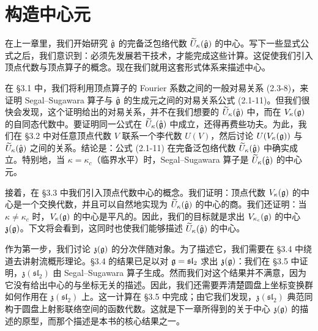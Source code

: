 
\chapter{构造中心元}

在上一章里，我们开始研究 $\hat{\mathfrak{g}}$ 的完备泛包络代数 $\widetilde U_\kappa(\hat{\mathfrak{g}})$ 的中心。写下一些显式公式之后，我们意识到：必须先发展若干技术，才能完成这些计算。这促使我们引入顶点代数与顶点算子的概念。现在我们就用这套形式体系来描述中心。

在 §3.1 中，我们将利用顶点算子的 Fourier 系数之间的一般对易关系 (2.3-8)，来证明 Segal--Sugawara 算子与 $\hat{\mathfrak{g}}$ 的生成元之间的对易关系公式 (2.1-11)。但我们很快会发现，这个证明给出的对易关系，并不在我们想要的 $\widetilde U_\kappa(\hat{\mathfrak{g}})$ 中，而在 $V_\kappa(\mathfrak{g})$ 的自同态代数中。要证明同一公式在 $\widetilde U_\kappa(\hat{\mathfrak{g}})$ 中成立，还得再费些功夫。为此，我们在 §3.2 中对任意顶点代数 $V$ 联系一个李代数 $U(V)$，然后讨论 $U(V_\kappa(\mathfrak{g}))$ 与 $\widetilde U_\kappa(\hat{\mathfrak{g}})$ 之间的关系。结论是：公式 (2.1-11) 在完备泛包络代数 $\widetilde U_\kappa(\hat{\mathfrak{g}})$ 中确实成立。特别地，当 $\kappa=\kappa_c$（临界水平）时，Segal--Sugawara 算子是 $\widetilde U_\kappa(\hat{\mathfrak{g}})$ 的中心元。

接着，在 §3.3 中我们引入顶点代数中心的概念。我们证明：顶点代数 $V_\kappa(\mathfrak{g})$ 的中心是一个交换代数，并且可以自然地实现为 $\widetilde U_\kappa(\hat{\mathfrak{g}})$ 的中心的商。我们还证明：当 $\kappa\neq\kappa_c$ 时，$V_\kappa(\mathfrak{g})$ 的中心是平凡的。因此，我们的目标就是求出 $V_{\kappa_c}(\mathfrak{g})$ 的中心 $\mathfrak z(\mathfrak{g})$。下文将会看到，这同时也使我们能够描述 $\widetilde U_\kappa(\hat{\mathfrak{g}})$ 的中心。

作为第一步，我们讨论 $\mathfrak z(\mathfrak{g})$ 的分次伴随对象。为了描述它，我们需要在 §3.4 中绕道去讲射流概形理论。§3.4 的结果已足以对 $\mathfrak{g}=\mathfrak{sl}_2$ 求出 $\mathfrak z(\mathfrak{g})$：我们在 §3.5 中证明，$\mathfrak z(\mathfrak{sl}_2)$ 由 Segal--Sugawara 算子生成。然而我们对这个结果并不满意，因为它没有给出中心的与坐标无关的描述。因此，我们还需要弄清楚圆盘上坐标变换群如何作用在 $\mathfrak z(\mathfrak{sl}_2)$ 上。这一计算在 §3.5 中完成；由它我们发现，$\mathfrak z(\mathfrak{sl}_2)$ 典范同构于圆盘上射影联络空间的函数代数。这就是下一章所得到的关于中心 $\mathfrak z(\mathfrak{g})$ 的描述的原型，而那个描述是本书的核心结果之一。

